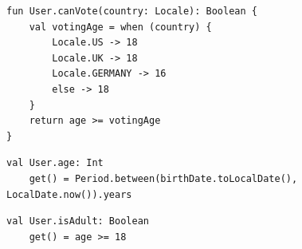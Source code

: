 \begin{lstlisting}[caption=Extension function sprawdzające czy użytkownik jest uprawniony do głosowania w w danym kraju]
fun User.canVote(country: Locale): Boolean {
    val votingAge = when (country) {
        Locale.US -> 18
        Locale.UK -> 18
        Locale.GERMANY -> 16
        else -> 18
    }
    return age >= votingAge
}
\end{lstlisting}

\begin{lstlisting}[caption=Extension property zwracające wiek użytkownika]
val User.age: Int
    get() = Period.between(birthDate.toLocalDate(), LocalDate.now()).years
\end{lstlisting}

\begin{lstlisting}[caption=Extension property zwracające czy użytkownik jest powyżej 18 roku życia]
val User.isAdult: Boolean
    get() = age >= 18
\end{lstlisting}

